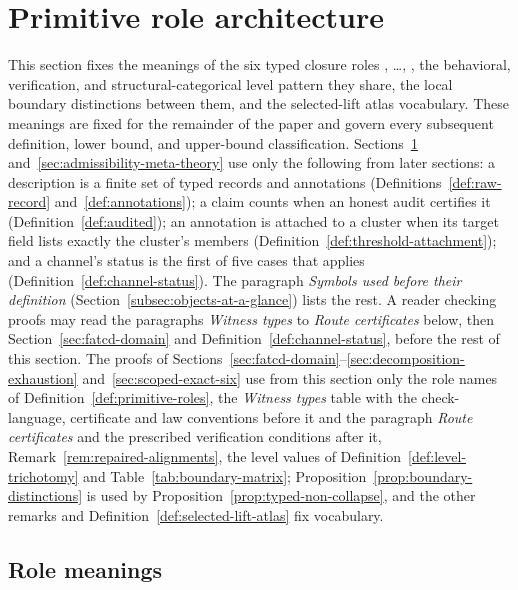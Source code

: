 \section{Primitive role architecture}\label{sec:primitive-role-architecture}


This section fixes the meanings of the six typed closure roles
\Pone{}, \ldots, \Psix{}, the behavioral, verification, and
structural-categorical level pattern they share, the local boundary
distinctions between them, and the selected-lift atlas vocabulary.
These meanings are fixed for the remainder of the paper and govern
every subsequent definition, lower bound, and upper-bound
classification. Sections~\ref{sec:primitive-role-architecture}
and~\ref{sec:admissibility-meta-theory} use only the following from later
sections: a description is a finite set of typed records and annotations
(Definitions~\ref{def:raw-record} and~\ref{def:annotations}); a claim counts
when an honest audit certifies it (Definition~\ref{def:audited}); an
annotation is attached to a cluster when its target field lists exactly the
cluster's members (Definition~\ref{def:threshold-attachment}); and a channel's
status is the first of five cases that applies
(Definition~\ref{def:channel-status}). The paragraph \emph{Symbols used before
their definition} (Section~\ref{subsec:objects-at-a-glance}) lists the rest. A reader checking
proofs may read the paragraphs \emph{Witness types} to \emph{Route
certificates} below, then Section~\ref{sec:fatcd-domain} and
Definition~\ref{def:channel-status}, before the rest of this section.
The proofs of Sections~\ref{sec:fatcd-domain}--\ref{sec:decomposition-exhaustion}
and~\ref{sec:scoped-exact-six} use from this section only the role names of
Definition~\ref{def:primitive-roles}, the \emph{Witness types} table with the
check-language, certificate and law conventions before it and the paragraph
\emph{Route certificates} and the prescribed verification conditions after it,
Remark~\ref{rem:repaired-alignments}, the level values of
Definition~\ref{def:level-trichotomy} and Table~\ref{tab:boundary-matrix};
Proposition~\ref{prop:boundary-distinctions} is used by
Proposition~\ref{prop:typed-non-collapse}, and the other remarks and
Definition~\ref{def:selected-lift-atlas} fix vocabulary.

\subsection{Role meanings}\label{subsec:role-meanings}

